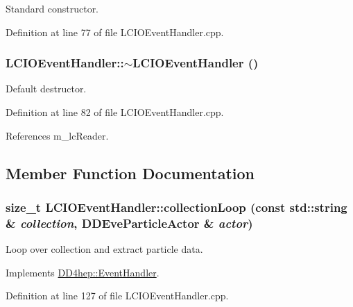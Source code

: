 Standard constructor. 

Definition at line 77 of file LCIOEventHandler.cpp.\hypertarget{class_d_d4hep_1_1_l_c_i_o_event_handler_a26f3acb33ae47d75cee43a2268e5945b}{
\subsubsection[{$\sim$LCIOEventHandler}]{\setlength{\rightskip}{0pt plus 5cm}LCIOEventHandler::$\sim$LCIOEventHandler ()}}
\label{class_d_d4hep_1_1_l_c_i_o_event_handler_a26f3acb33ae47d75cee43a2268e5945b}


Default destructor. 

Definition at line 82 of file LCIOEventHandler.cpp.

References m\_\-lcReader.

\subsection{Member Function Documentation}
\hypertarget{class_d_d4hep_1_1_l_c_i_o_event_handler_aa741ce2b60b3eddd4ddeb1fba6197a86}{
\subsubsection[{collectionLoop}]{\setlength{\rightskip}{0pt plus 5cm}size\_\-t LCIOEventHandler::collectionLoop (const std::string \& {\em collection}, \/  {\bf DDEveParticleActor} \& {\em actor})}}
\label{class_d_d4hep_1_1_l_c_i_o_event_handler_aa741ce2b60b3eddd4ddeb1fba6197a86}


Loop over collection and extract particle data. 

Implements \hyperlink{class_d_d4hep_1_1_event_handler_ae43595c2760736a7ca628183a2c91ec2}{DD4hep::EventHandler}.

Definition at line 127 of file LCIOEventHandler.cpp.

